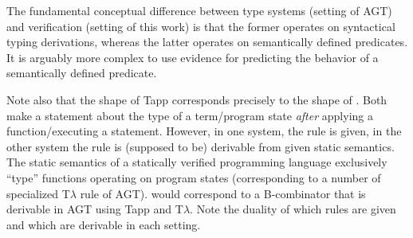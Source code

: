 The fundamental conceptual difference between type systems (setting of AGT) and verification (setting of this work) is that the former operates on syntactical typing derivations, whereas the latter operates on semantically defined predicates.
It is arguably more complex to use evidence for predicting the behavior of a semantically defined predicate.

Note also that the shape of Tapp corresponds precisely to the shape of .
Both make a statement about the type of a term/program state \emph{after} applying a function/executing a statement.
However, in one system, the rule is given, in the other system the rule is (supposed to be) derivable from given static semantics.
The static semantics of a statically verified programming language exclusively “type” functions operating on program states (corresponding to a number of specialized T$\lambda$ rule of AGT).
 would correspond to a B-combinator that is derivable in AGT using Tapp and T$\lambda$.
Note the duality of which rules are given and which are derivable in each setting.



